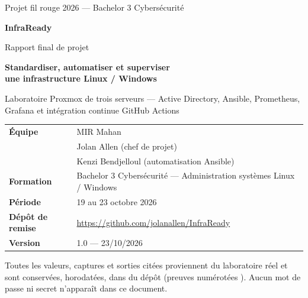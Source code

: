 \begin{titlepage}

  \vspace*{0.4cm}
  {\sffamily\color{white}
   {\large Projet fil rouge 2026 — Bachelor 3 Cybersécurité\par}
   \vspace{0.9cm}
   {\fontsize{40}{44}\selectfont\bfseries InfraReady\par}
   \vspace{0.35cm}
   {\LARGE Rapport final de projet\par}}

  \vspace{3.2cm}
  {\sffamily\Large\color{bleu}\bfseries
   Standardiser, automatiser et superviser\\ une infrastructure Linux / Windows\par}
  \vspace{0.4cm}
  {\large Laboratoire Proxmox de trois serveurs — Active Directory, Ansible,
   Prometheus, Grafana et intégration continue GitHub Actions\par}

  \vspace{1.6cm}
  \noindent\begin{tabularx}{\linewidth}{@{}>{\sffamily\bfseries\color{bleu}}lL@{}}
    Équipe            & MIR Mahan \\
                      & Jolan Allen (chef de projet) \\
                      & Kenzi Bendjelloul (automatisation Ansible) \\[4pt]
    Formation         & Bachelor 3 Cybersécurité — Administration systèmes Linux / Windows \\[4pt]
    Période           & 19 au 23 octobre 2026 \\[4pt]
    Dépôt de remise   & \url{https://github.com/jolanallen/InfraReady} \\[4pt]
    Version           & 1.0 — 23/10/2026 \\
  \end{tabularx}

  \vfill
  {\small\color{gris}
   Toutes les valeurs, captures et sorties citées proviennent du laboratoire réel et sont conservées,
   horodatées, dans  du dépôt (preuves numérotées ).
   Aucun mot de passe ni secret n'apparaît dans ce document.\par}
  \restoregeometry
\end{titlepage}
